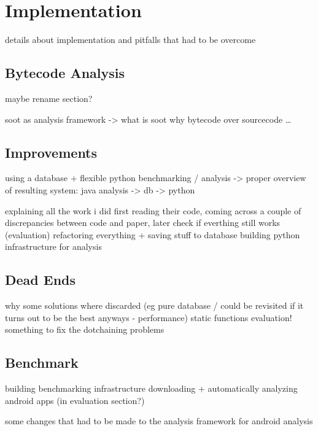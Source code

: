 \chapter{Implementation}
details about implementation and pitfalls that had to be overcome

\section{Bytecode Analysis}
maybe rename section?

soot as analysis framework -> what is soot
why bytecode over sourcecode
\ldots

\section{Improvements}
using a database + flexible python benchmarking / analysis
-> proper overview of resulting system: java analysis -> db -> python

explaining all the work i did
    first reading their code, coming across a couple of discrepancies between code and paper, later check if everthing still works (evaluation)
    refactoring everything + saving stuff to database
    building python infrastructure for analysis

\section{Dead Ends}
why some solutions where discarded (eg pure database / could be revisited if it turns out to be the best anyways - performance)
static functions evaluation!
something to fix the dotchaining problems

\section{Benchmark}

building benchmarking infrastructure
downloading + automatically analyzing android apps (in evaluation section?)

some changes that had to be made to the analysis framework for android analysis
